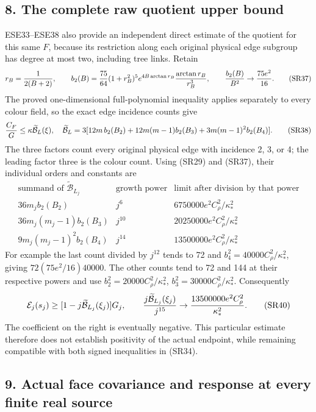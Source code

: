 \documentclass[11pt]{article}
\begin{document}
\subsection*{8. The complete raw quotient upper bound}

ESE33–ESE38 also provide an independent direct estimate of the quotient for this same \(F\), because its restriction along each original physical edge subgroup has degree at most two, including tree links. Retain
\[
r_B={1\over2(B+2)},\qquad
b_2(B)={75\over64}(1+r_B^2)^5e^{4B\arctan r_B}{\arctan r_B\over r_B^3},\qquad
{b_2(B)\over B^2}\to{75e^2\over16}.
\tag{SR37}
\]
The proved one-dimensional full-polynomial inequality applies separately to every colour field, so the exact edge incidence counts give
\[
{C_F\over G}\le\kappa\widetilde{\mathcal B}_L(\xi),\quad
\widetilde{\mathcal B}_L=3[12m\,b_2(B_2)+12m(m-1)b_2(B_3)+3m(m-1)^2b_2(B_4)].
\tag{SR38}
\]
The three factors count every original physical edge with incidence 2, 3, or 4; the leading factor three is the colour count. Using (SR29) and (SR37), their individual orders and constants are
\[
\begin{array}{c|c|c}
\text{summand of }\widetilde{\mathcal B}_{L_j}&\text{growth power}&\text{limit after division by that power}\\\hline
36m_jb_2(B_2)&j^6&6750000e^2C_\rho^2/\kappa_*^2\\
36m_j(m_j-1)b_2(B_3)&j^{10}&20250000e^2C_\rho^2/\kappa_*^2\\
9m_j(m_j-1)^2b_2(B_4)&j^{14}&13500000e^2C_\rho^2/\kappa_*^2
\end{array}\tag{SR39}
\]
For example the last count divided by \(j^{12}\) tends to 72 and \(b_4^2=40000C_\rho^2/\kappa_*^2\), giving \(72(75e^2/16)40000\). The other counts tend to 72 and 144 at their respective powers and use \(b_2^2=20000C_\rho^2/\kappa_*^2\), \(b_3^2=30000C_\rho^2/\kappa_*^2\). Consequently
\[
\mathcal E_j(s_j)\ge[1-j\widetilde{\mathcal B}_{L_j}(\xi_j)]G_j,\qquad
{j\widetilde{\mathcal B}_{L_j}(\xi_j)\over j^{15}}
\to{13500000e^2C_\rho^2\over\kappa_*^2}.
\tag{SR40}
\]
The coefficient on the right is eventually negative. This particular estimate therefore does not establish positivity of the actual endpoint, while remaining compatible with both signed inequalities in (SR34).

\subsection*{9. Actual face covariance and response at every finite real source}
\end{document}
